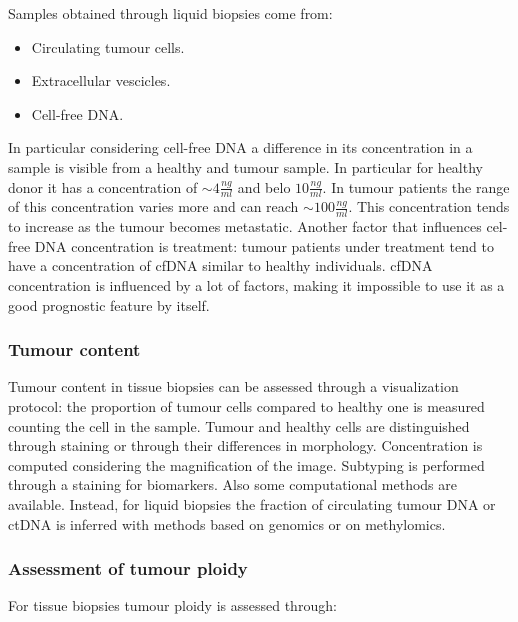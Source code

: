          Samples obtained through liquid biopsies come from:

         \begin{multicols}{2}
             \begin{itemize}
                 \item Circulating tumour cells.
                 \item Extracellular vescicles.
                 \item Cell-free DNA.
             \end{itemize}
         \end{multicols}

         In particular considering cell-free DNA a difference in its concentration in a sample is visible from a healthy and tumour sample.
         In particular for healthy donor it has a concentration of $\sim 4\frac{ng}{ml}$ and belo $10\frac{ng}{ml}$.
         In tumour patients the range of this concentration varies more and can reach $\sim 100\frac{ng}{ml}$.
         This concentration tends to increase as the tumour becomes metastatic.
         Another factor that influences cel-free DNA concentration is treatment: tumour patients under treatment tend to have a concentration of cfDNA similar to healthy individuals.
         cfDNA concentration is influenced by a lot of factors, making it impossible to use it as a good prognostic feature by itself.

         \subsubsection{Tumour content}
         Tumour content in tissue biopsies can be assessed through a visualization protocol: the proportion of tumour cells compared to healthy one is measured counting the cell in the sample.
         Tumour and healthy cells are distinguished through staining or through their differences in morphology.
         Concentration is computed considering the magnification of the image.
         Subtyping is performed through a staining for biomarkers.
         Also some computational methods are available.
         Instead, for liquid biopsies the fraction of circulating tumour DNA or ctDNA is inferred with methods based on genomics or on methylomics.

         \subsubsection{Assessment of tumour ploidy}
         For tissue biopsies tumour ploidy is assessed through:

